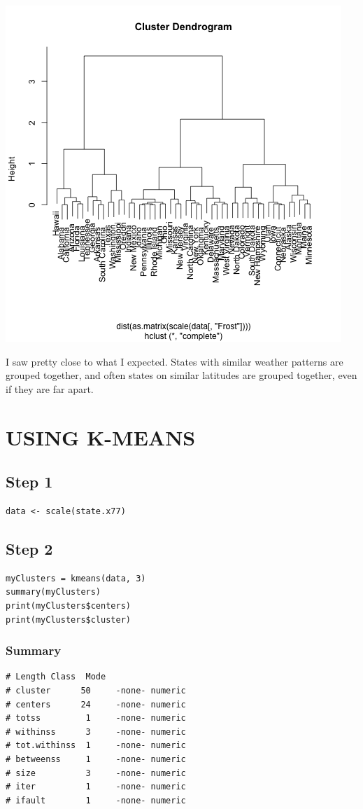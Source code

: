 \documentclass[11pt]{article}
\begin{document}
\begin{center}
\includegraphics[width=.9\linewidth]{hclust-only-frost-with-scale.png}
\end{center}

I saw pretty close to what I expected. States with similar weather patterns are
grouped together, and often states on similar latitudes are grouped together,
even if they are far apart. 
\section*{USING K-MEANS}
\label{sec:orgeaed122}
\subsection*{Step 1}
\label{sec:org68e3cc6}
\begin{verbatim}
data <- scale(state.x77)
\end{verbatim}
\subsection*{Step 2}
\label{sec:org49b60ca}
\begin{verbatim}
myClusters = kmeans(data, 3)
summary(myClusters)
print(myClusters$centers)
print(myClusters$cluster)
\end{verbatim}
\subsubsection*{Summary}
\label{sec:org71a6acb}
\begin{verbatim}
# Length Class  Mode
# cluster      50     -none- numeric
# centers      24     -none- numeric
# totss         1     -none- numeric
# withinss      3     -none- numeric
# tot.withinss  1     -none- numeric
# betweenss     1     -none- numeric
# size          3     -none- numeric
# iter          1     -none- numeric
# ifault        1     -none- numeric
\end{verbatim}
\end{document}
